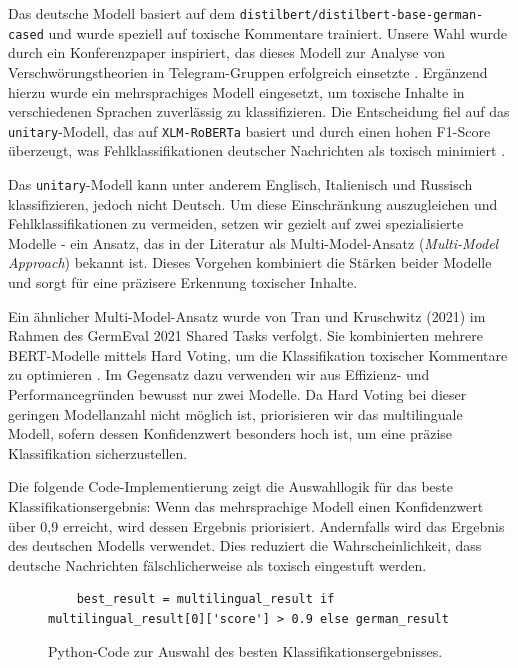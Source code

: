 \documentclass[12pt]{report}
\begin{document}
Das deutsche Modell basiert auf dem \texttt{distilbert/distilbert-base-german-cased} und wurde speziell auf toxische Kommentare trainiert. Unsere Wahl wurde durch ein Konferenzpaper inspiriert, das dieses Modell zur Analyse von Verschwörungstheorien in Telegram-Gruppen erfolgreich einsetzte \cite{weigand-etal-2022-conspiracy}. Ergänzend hierzu wurde ein mehrsprachiges Modell eingesetzt, um toxische Inhalte in verschiedenen Sprachen zuverlässig zu klassifizieren. Die Entscheidung fiel auf das \texttt{unitary}-Modell, das auf \texttt{XLM-RoBERTa} basiert und durch einen hohen F1-Score überzeugt, was Fehlklassifikationen deutscher Nachrichten als toxisch minimiert \cite{model-comparison}.\newline

Das \texttt{unitary}-Modell kann unter anderem Englisch, Italienisch und Russisch klassifizieren, jedoch nicht Deutsch. Um diese Einschränkung auszugleichen und Fehlklassifikationen zu vermeiden, setzen wir gezielt auf zwei spezialisierte Modelle - ein Ansatz, das in der Literatur als Multi-Model-Ansatz (\textit{Multi-Model Approach}) bekannt ist. Dieses Vorgehen kombiniert die Stärken beider Modelle und sorgt für eine präzisere Erkennung toxischer Inhalte.\newline

Ein ähnlicher Multi-Model-Ansatz wurde von Tran und Kruschwitz (2021) im Rahmen des GermEval 2021 Shared Tasks verfolgt. Sie kombinierten mehrere BERT-Modelle mittels Hard Voting, um die Klassifikation toxischer Kommentare zu optimieren \cite{tran2021ensemble}. Im Gegensatz dazu verwenden wir aus Effizienz- und Performancegründen bewusst nur zwei Modelle. Da Hard Voting bei dieser geringen Modellanzahl nicht möglich ist, priorisieren wir das multilinguale Modell, sofern dessen Konfidenzwert besonders hoch ist, um eine präzise Klassifikation sicherzustellen.\newline

Die folgende Code-Implementierung zeigt die Auswahllogik für das beste Klassifikationsergebnis: Wenn das mehrsprachige Modell einen Konfidenzwert über 0,9 erreicht, wird dessen Ergebnis priorisiert. Andernfalls wird das Ergebnis des deutschen Modells verwendet. Dies reduziert die Wahrscheinlichkeit, dass deutsche Nachrichten fälschlicherweise als toxisch eingestuft werden.
\begin{figure}[h]
	\centering
\begin{lstlisting}
	best_result = multilingual_result if multilingual_result[0]['score'] > 0.9 else german_result
\end{lstlisting}
\caption{Python-Code zur Auswahl des besten Klassifikationsergebnisses.}
\label{fig:best_result_selection}
\end{figure}
\end{document}
